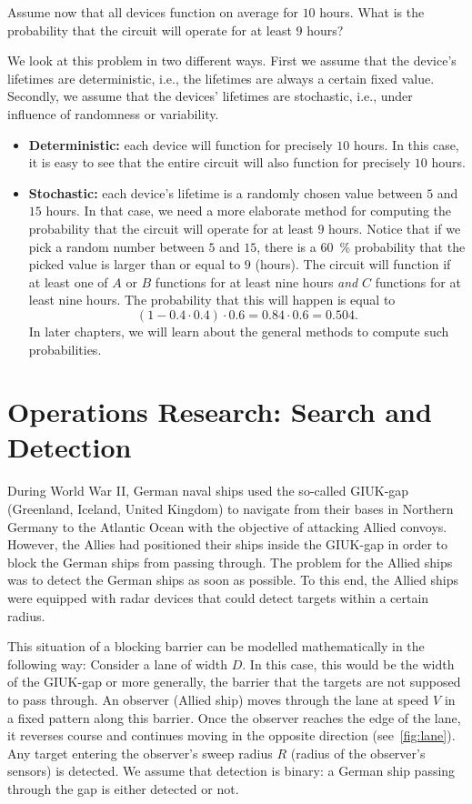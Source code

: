 Assume now that all devices function on average for $10$ hours.
What is the probability that the circuit will operate for at least $9$ hours?

We look at this problem in two different ways.
First we assume that the device's lifetimes are deterministic, i.e., the lifetimes are always a certain fixed value.
Secondly, we assume that the devices' lifetimes are stochastic, i.e., under influence of randomness or variability.

\begin{itemize}
    \item {\bfseries Deterministic:} each device will function for precisely $10$ hours. In this case, it is easy to see that the entire circuit will also function for precisely $10$ hours.
    \item {\bfseries Stochastic:} each device's lifetime is a randomly chosen value between $5$ and $15$ hours.
    In that case, we need a more elaborate method for computing the probability that the circuit will operate for at least $9$ hours.
    Notice that if we pick a random number between $5$ and $15$, there is a \SI{60}{\percent} probability that the picked value is larger than or equal to $9$ (hours).
    The circuit will function if at least one of $A$ or $B$ functions for at least nine hours \emph{and} $C$ functions for at least nine hours.
    The probability that this will happen is equal to 
    \[
        \left(1 - 0.4 \cdot 0.4\right) \cdot 0.6 = 0.84 \cdot 0.6 = 0.504.
    \]
    In later chapters, we will learn about the general methods to compute such probabilities.
\end{itemize}

\section{Operations Research: Search and Detection}
During World War II, German naval ships used the so-called GIUK-gap (Greenland, Iceland, United Kingdom) to navigate from their bases in Northern Germany to the Atlantic Ocean with the objective of attacking Allied convoys.
However, the Allies had positioned their ships inside the GIUK-gap in order to block the German ships from passing through.
The problem for the Allied ships was to detect the German ships as soon as possible.
To this end, the Allied ships were equipped with radar devices that could detect targets within a certain radius.

This situation of a blocking barrier can be modelled mathematically in the following way:
Consider a lane of width $D$. In this case, this would be the width of the GIUK-gap or more generally, the barrier that the targets are not supposed to pass through.
An observer (Allied ship) moves through the lane at speed $V$ in a fixed pattern along this barrier.
Once the observer reaches the edge of the lane, it reverses course and continues moving in the opposite direction (see~\cref{fig:lane}).
Any target entering the observer's sweep radius $R$ (radius of the observer's sensors) is detected.
We assume that detection is binary: a German ship passing through the gap is either detected or not.

